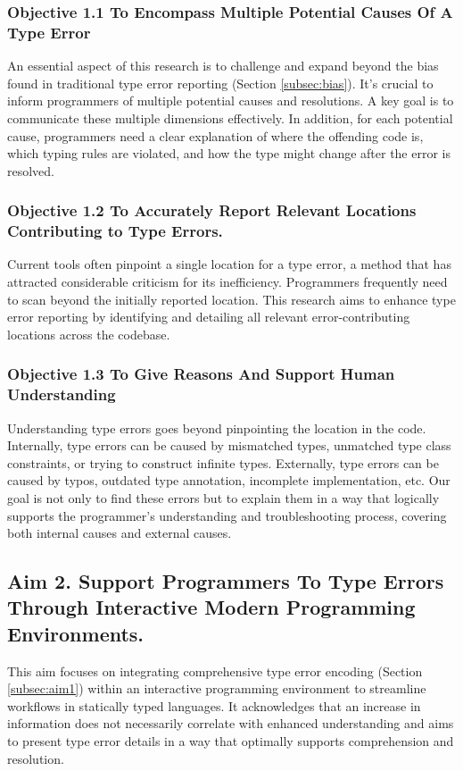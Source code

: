 \subsubsection{Objective 1.1 To Encompass Multiple Potential Causes Of A Type Error}
An essential aspect of this research is to challenge and expand beyond the bias found in traditional type error reporting (Section \ref{subsec:bias}). It's crucial to inform programmers of multiple potential causes and resolutions. A key goal is to communicate these multiple dimensions effectively. In addition, for each potential cause, programmers need a clear explanation of where the offending code is, which typing rules are violated, and how the type might change after the error is resolved.


\subsubsection{Objective 1.2 To Accurately Report Relevant Locations Contributing to Type Errors.}
Current tools often pinpoint a single location for a type error, a method that has attracted considerable criticism for its inefficiency. Programmers frequently need to scan beyond the initially reported location. This research aims to enhance type error reporting by identifying and detailing all relevant error-contributing locations across the codebase.

\subsubsection{Objective 1.3 To Give Reasons And Support Human Understanding}
Understanding type errors goes beyond pinpointing the location in the code. Internally, type errors can be caused by mismatched types, unmatched type class constraints, or trying to construct infinite types. Externally, type errors can be caused by typos, outdated type annotation, incomplete implementation, etc. Our goal is not only to find these errors but to explain them in a way that logically supports the programmer's understanding and troubleshooting process, covering both internal causes and external causes.



\subsection{Aim 2. Support Programmers To Type Errors Through Interactive Modern Programming Environments.}

This aim focuses on integrating comprehensive type error encoding (Section \ref{subsec:aim1}) within an interactive programming environment to streamline workflows in statically typed languages. It acknowledges that an increase in information does not necessarily correlate with enhanced understanding and aims to present type error details in a way that optimally supports comprehension and resolution.

